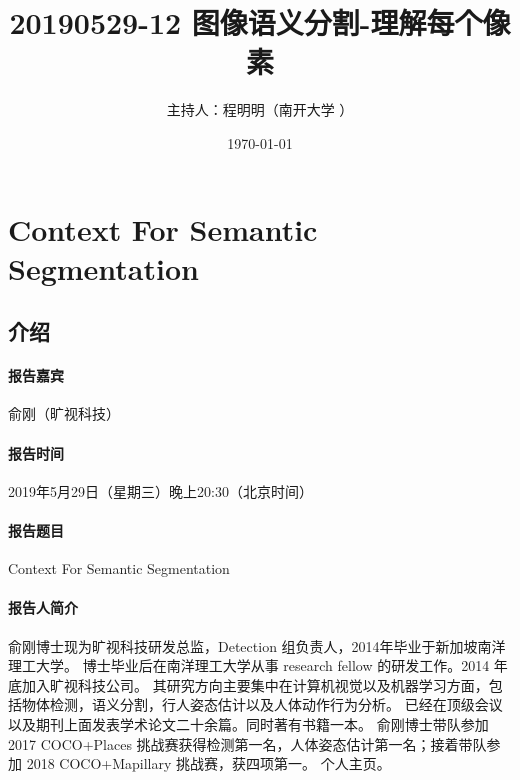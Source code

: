 \documentclass[UTF8, a4paper]{ctexart}
\begin{document}
\title{20190529-12 图像语义分割-理解每个像素\cite{slides}}
\author{主持人：程明明（南开大学 ）}
\date\today
\maketitle
\tableofcontents
\fi


\section{Context For Semantic Segmentation}

\subsection{介绍}
\paragraph{报告嘉宾}
俞刚（旷视科技）

\paragraph{报告时间}
2019年5月29日（星期三）晚上20:30（北京时间）

\paragraph{报告题目}Context For Semantic Segmentation

\paragraph{报告人简介}
俞刚博士现为旷视科技研发总监，Detection 组负责人，2014年毕业于新加坡南洋理工大学。
博士毕业后在南洋理工大学从事 research fellow 的研发工作。2014 年底加入旷视科技公司。
其研究方向主要集中在计算机视觉以及机器学习方面，包括物体检测，语义分割，行人姿态估计以及人体动作行为分析。
已经在顶级会议以及期刊上面发表学术论文二十余篇。同时著有书籍一本。
俞刚博士带队参加 2017 COCO+Places 挑战赛获得检测第一名，人体姿态估计第一名；接着带队参加 2018 COCO+Mapillary 挑战赛，获四项第一。
个人主页\cite{Gangyu}。
\end{document}
